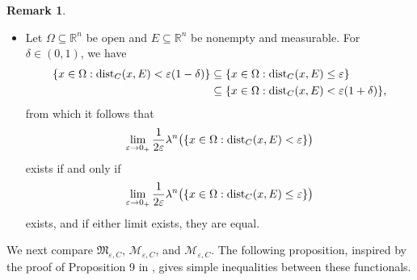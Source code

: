 \documentclass[pdflatex,sn-mathphys-num]{sn-jnl}
\theoremstyle{plain}
\theoremstyle{definition}
\newtheorem{rem}[theorem]{Remark}
\DeclareMathOperator{\inter}{\textup{int}}
\DeclareMathOperator{\dist}{\textup{dist}}
\begin{document}
\begin{rem}
\begin{itemize}
    Similarly, for $E\subseteq\Omega$,
    \begin{equation*}
        \big(E\oplus\varepsilon \inter(C)\big)\cap(\Omega\setminus E)=\{x\in\Omega\setminus E:\textup{dist}_C(x, E)<\varepsilon\},
    \end{equation*}
    and
    \begin{equation}\label{jelp}
        \lambda^n\big((E\oplus\varepsilon C)\cap(\Omega\setminus E)\big)=\lambda^n\big(\{x\in\Omega:\textup{dist}_C(x, E)\in(0, \varepsilon)\}\big)+\lambda^n\big((\overline{E}\setminus E)\cap\Omega\big),
    \end{equation}
    hence
    \begin{equation}\label{eq:9}
        \mathcal{SM}_{\varepsilon, C}(E; \Omega)=\frac{1}{\varepsilon}\lambda^n\big(\{x\in\Omega:\dist_C(x, E)\in(0, \varepsilon)\}\big)+\frac{1}{\varepsilon}\lambda^n\big((\overline{E}\setminus E)\cap\Omega\big).
    \end{equation} 

    \item Let $\Omega\subseteq\mathbb{R}^n$ be open and $E\subseteq\mathbb{R}^n$ be nonempty and measurable. For $\delta\in(0, 1)$, we have
    \begin{equation*}
        \begin{split}
    \{x\in\Omega:\textup{dist}_C(x, E)<\varepsilon(1-\delta)\}&\subseteq\{x\in\Omega:\textup{dist}_C(x, E)\leq\varepsilon\}\\&\subseteq\{x\in\Omega:\textup{dist}_C(x, E)<\varepsilon(1+\delta)\},        
        \end{split}
    \end{equation*}
    from which it follows that
    \[
    \lim_{\varepsilon\to0_+}\frac{1}{2\varepsilon}\lambda^n\big(\{x\in\Omega:\textup{dist}_C(x, E)<\varepsilon\}\big)
    \]
    exists if and only if
    \[
    \lim_{\varepsilon\to0_+}\frac{1}{2\varepsilon}\lambda^n\big(\{x\in\Omega:\textup{dist}_C(x, E)\leq\varepsilon\}\big)
    \]
    exists, and if either limit exists, they are equal.
\end{itemize}
\end{rem}
We next compare $\mathfrak{M}_{\varepsilon, C}$, $\mathscr{M}_{\varepsilon, C}$, and $\mathcal{M}_{\varepsilon, C}$. The following proposition, inspired by the proof of Proposition 9 in \cite{Rataj}, gives simple inequalities between these functionals.
\end{document}

